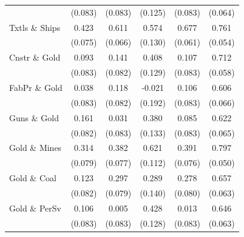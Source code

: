 \begin{table}
\begin{tabular}[t]{lccccc}
 & (0.083) & (0.083) & (0.125) & (0.083) & (0.064)\\
Txtls \& Ships & 0.423 & 0.611 & 0.574 & 0.677 & 0.761\\
 & (0.075) & (0.066) & (0.130) & (0.061) & (0.054)\\
Cnstr \& Gold & 0.093 & 0.141 & 0.408 & 0.107 & 0.712\\
\addlinespace
 & (0.083) & (0.082) & (0.129) & (0.083) & (0.058)\\
FabPr \& Gold & 0.038 & 0.118 & -0.021 & 0.106 & 0.606\\
 & (0.083) & (0.082) & (0.192) & (0.083) & (0.066)\\
Guns \& Gold & 0.161 & 0.031 & 0.380 & 0.085 & 0.622\\
 & (0.082) & (0.083) & (0.133) & (0.083) & (0.065)\\
\addlinespace
Gold \& Mines & 0.314 & 0.382 & 0.621 & 0.391 & 0.797\\
 & (0.079) & (0.077) & (0.112) & (0.076) & (0.050)\\
Gold \& Coal & 0.123 & 0.297 & 0.289 & 0.278 & 0.657\\
 & (0.082) & (0.079) & (0.140) & (0.080) & (0.063)\\
Gold \& PerSv & 0.106 & 0.005 & 0.428 & 0.013 & 0.646\\
\addlinespace
 & (0.083) & (0.083) & (0.128) & (0.083) & (0.063)\\
\bottomrule
\end{tabular}
\end{table}
